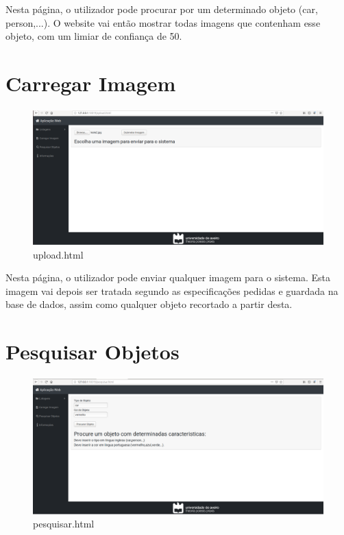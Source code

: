 \documentclass{report}
\begin{document}
Nesta página, o utilizador pode procurar por um determinado objeto (car, person,...). O website vai então mostrar todas imagens que contenham esse objeto, com um limiar de confiança de 50.


\section{Carregar Imagem}
\paragraph{}

\begin{figure}[H]
\centering
\includegraphics[width=1\linewidth]{upload.png}
\caption{upload.html}
\end{figure}

Nesta página, o utilizador pode enviar qualquer imagem para o sistema. Esta imagem vai depois ser tratada segundo as especificações pedidas e guardada na base de dados, assim como qualquer objeto recortado a partir desta.


\section{Pesquisar Objetos}
\paragraph{}

\begin{figure}[H]
\centering
\includegraphics[width=1\linewidth]{pesquisar.png}
\caption{pesquisar.html}
\end{figure}
\end{document}
